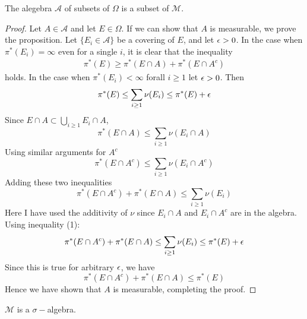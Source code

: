  \begin{proposition}
   The alegebra $ \mathscr{A}$ of subsets of $\Omega$ is a subset of $ \mathscr{M}$.
 \end{proposition}
 \begin{proof}
   Let $A\in \mathscr{A}$ and let $E\in\Omega$. If we can show that $A$ is measurable, we prove the proposition. Let $\{E_i \in \mathscr{A}\}$ be a covering of $E$, and let $\epsilon>0$. In the case when $\pi^*(E_i) = \infty$ even for a single $i$, it is clear that the inequality
   \begin{align}
     \pi^*(E) \geq \pi^*(E\cap A) + \pi^*(E\cap A^c)
   \end{align}
   holds. In the case when $\pi^*(E_i) < \infty$ forall $i\geq 1$ let $\epsilon>0$. Then
   \[\pi^*(E) \leq \sum_{i\geq 1}\nu(E_i) \leq \pi^*(E) + \epsilon \]
   Since $E\cap A \subset \bigcup_{i\geq 1} E_i\cap A$,
   \[\pi^*(E\cap A) \leq \sum_{i \geq 1} \nu(E_i \cap A)\]
   Using similar arguments for $A^c$
   \[\pi^*(E\cap A^c) \leq \sum_{i \geq 1} \nu(E_i \cap A^c)\]
   Adding these two inequalities
   \[\pi^*(E\cap A^c) + \pi^*(E\cap A) \leq \sum_{i \geq 1} \nu(E_i)\]
   Here I have used the additivity of $\nu$ since $E_i\cap A$ and $E_i\cap A^c$ are in the algebra. Using inequality (1):
   \[\pi^*(E\cap A^c) + \pi^*(E\cap A) \leq \sum_{i \geq 1} \nu(E_i) \leq \pi^*(E) + \epsilon\]
   Since this is true for arbitrary $\epsilon$, we have
   \[\pi^*(E\cap A^c) + \pi^*(E\cap A)  \leq \pi^*(E) \]
   Hence we have shown that $A$ is measurable, completing the proof.
 \end{proof}
 \begin{proposition}
   $ \mathscr{M}$ is a $\sigma-$algebra.
 \end{proposition}
